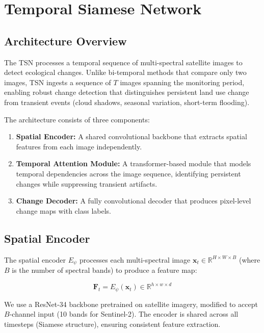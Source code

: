 \section{Temporal Siamese Network}

\label{sec:tsn}

\subsection{Architecture Overview}

The TSN processes a temporal sequence of multi-spectral satellite images to detect ecological changes.
Unlike bi-temporal methods that compare only two images, TSN ingests a sequence of $T$ images spanning the monitoring period, enabling robust change detection that distinguishes persistent land use change from transient events (cloud shadows, seasonal variation, short-term flooding).

The architecture consists of three components:

\begin{enumerate}[leftmargin=*]
    \item \textbf{Spatial Encoder:} A shared convolutional backbone that extracts spatial features from each image independently.
    \item \textbf{Temporal Attention Module:} A transformer-based module that models temporal dependencies across the image sequence, identifying persistent changes while suppressing transient artifacts.
    \item \textbf{Change Decoder:} A fully convolutional decoder that produces pixel-level change maps with class labels.
\end{enumerate}

\subsection{Spatial Encoder}

The spatial encoder $E_\psi$ processes each multi-spectral image $\mathbf{x}_t \in \mathbb{R}^{H \times W \times B}$ (where $B$ is the number of spectral bands) to produce a feature map:

\begin{equation}
    \mathbf{F}_t = E_\psi(\mathbf{x}_t) \in \mathbb{R}^{h \times w \times d}
\end{equation}

We use a ResNet-34 backbone pretrained on satellite imagery, modified to accept $B$-channel input (10 bands for Sentinel-2).
The encoder is shared across all timesteps (Siamese structure), ensuring consistent feature extraction.

